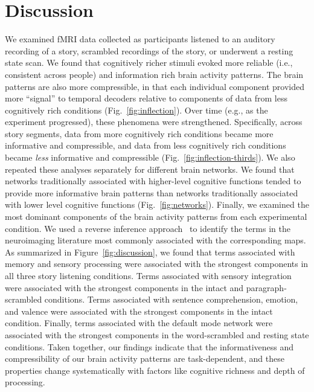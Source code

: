 \documentclass[english, 11pt]{article}
\begin{document}
\section*{Discussion}

We examined fMRI data collected as participants listened to an auditory
recording of a story, scrambled recordings of the story, or underwent a resting
state scan. We found that cognitively richer stimuli evoked more reliable
(i.e., consistent across people) and information rich brain activity patterns.
The brain patterns are also more compressible, in that each individual
component provided more ``signal'' to temporal decoders relative to components
of data from less cognitively rich conditions (Fig.~\ref{fig:inflection}). Over
time (e.g., as the experiment progressed), these phenomena were strengthened.
Specifically, across story segments, data from more cognitively rich conditions
became more informative and compressible, and data from less cognitively rich
conditions became \textit{less} informative and compressible
(Fig.~\ref{fig:inflection-thirds}). We also repeated these analyses separately
for different brain networks. We found that networks traditionally associated
with higher-level cognitive functions tended to provide more informative brain
patterns than networks traditionally associated with lower level cognitive
functions (Fig.~\ref{fig:networks}). Finally, we examined the most dominant
components of the brain activity patterns from each experimental condition. We
used a reverse inference approach~\citep{RubiEtal17} to identify the terms in
the neuroimaging literature most commonly associated with the corresponding
maps. As summarized in Figure~\ref{fig:discussion}, we found that terms
associated with memory and sensory processing were associated with the
strongest components in all three story listening conditions. Terms associated
with sensory integration were associated with the strongest components in the
intact and paragraph-scrambled conditions. Terms associated with sentence
comprehension, emotion, and valence were associated with the strongest
components in the intact condition. Finally, terms associated with the default
mode network were associated with the strongest components in the
word-scrambled and resting state conditions. Taken together, our findings
indicate that the informativeness and compressibility of our brain activity
patterns are task-dependent, and these properties change systematically with
factors like cognitive richness and depth of processing.
\end{document}
